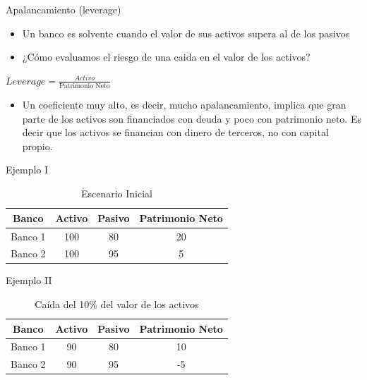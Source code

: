 \documentclass{beamer}
\begin{document}
\begin{frame}{Apalancamiento (leverage)}
    \begin{itemize}
    \item Un banco es solvente cuando el valor de sus activos supera al de los pasivos
     \item ¿Cómo evaluamos el riesgo de una caida en el valor de los activos?
    \end{itemize}
     \begin{center}
       $ Leverage = \frac{Activo}{\text{Patrimonio Neto}} $
    \end{center} 
    \begin{itemize}
    \item Un coeficiente muy alto, es decir, mucho apalancamiento, implica que gran parte de los activos son financiados con deuda y poco con patrimonio neto. Es decir que los activos se financian con dinero de terceros, no con capital propio.
    \end{itemize}
\end{frame}

\begin{frame}{Ejemplo I}
    \begin{table}[H]
    \centering
    \begin{tabular}{|c|c|c|c|}
    \hline
\textbf{Banco}    & \textbf{Activo} & \textbf{Pasivo} & \textbf{Patrimonio Neto}\\
         \hline \hline
         Banco 1 &  100 &  80 & 20\\[1mm]
        \hline
       Banco 2 & 100  &  95& 5\\[1mm]
        \hline
    \end{tabular}
    \caption{Escenario Inicial}
    \label{inicial}
\end{table}
\end{frame}

\begin{frame}{Ejemplo II}
   \begin{table}[H]
    \centering

    \begin{tabular}{|c|c|c|c|}
    \hline
\textbf{Banco}    & \textbf{Activo} & \textbf{Pasivo} & \textbf{Patrimonio Neto}\\
         \hline \hline
         Banco 1 &  90 &  80 & 10\\[1mm]
        \hline
       Banco 2 & 90  &  95& -5\\[1mm]
        \hline
    \end{tabular}
    \caption{Caída del 10\% del valor de los activos}
    \label{caida10pp}
\end{table} 
\end{frame} 
\end{document}
